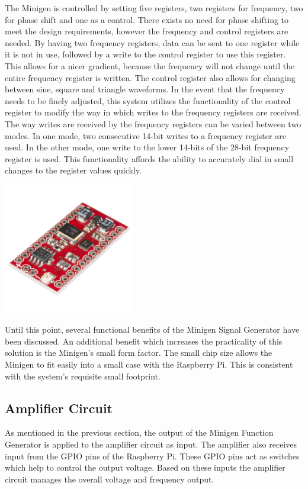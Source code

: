 \documentclass{article}	%
\begin{document}
\begin{multicols}{2}
The Minigen is controlled by setting five registers,
two registers for frequency, 
two for phase shift and 
one as a control. 
There exists no need for phase shifting
to meet the design requirements, 
however the frequency and control registers
are needed. 
By having two frequency registers,
data can be sent to one register while it is not in use,
followed by a write to the control register to use this register.
This allows for a nicer gradient, 
because the frequency will not change until the entire frequency register is written. 
The control register also allows for changing between sine, square and triangle waveforms.
In the event that the frequency needs to be finely adjusted,
this system utilizes the functionality of the control register
to modify the way in which writes to the frequency registers are received.
The way writes are received by the frequency registers 
can be varied between two modes.
In one mode,
two consecutive 14-bit writes to a frequency register are used.
In the other mode,
one write to the lower 14-bits of the 28-bit frequency register is used.
This functionality affords the ability to accurately dial in small changes to the register values quickly.

\begin{center}
\includegraphics[width=0.43\textwidth,keepaspectratio]{minigen_real.png}
\end{center}

Until this point,
several functional benefits of the Minigen Signal Generator have been discussed.
An additional benefit which 
increases the practicality of this solution is the Minigen's small form factor.
The small chip size 
allows the Minigen to fit easily into a small case 
with the Raspberry Pi.
This is consistent with the system's requisite small footprint.

\subsection{Amplifier Circuit}
As mentioned in the previous section,
the output of the Minigen Function Generator
is applied to the amplifier circuit as input.
The amplifier also receives input from 
the GPIO pins of the Raspberry Pi.
These GPIO pins act as switches which help to control the output voltage.
Based on these inputs 
the amplifier circuit manages the overall 
voltage and frequency output.


\end{multicols}
\end{document}
